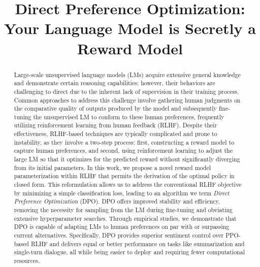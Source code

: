 \title{Direct Preference Optimization: Your Language Model is Secretly a Reward Model}

\begin{abstract}
Large-scale unsupervised language models (LMs) acquire extensive general knowledge and demonstrate certain reasoning capabilities; however, their behaviors are challenging to direct due to the inherent lack of supervision in their training process. Common approaches to address this challenge involve gathering human judgments on the comparative quality of outputs produced by the model and subsequently fine-tuning the unsupervised LM to conform to these human preferences, frequently utilizing reinforcement learning from human feedback (RLHF). Despite their effectiveness, RLHF-based techniques are typically complicated and prone to instability, as they involve a two-step process: first, constructing a reward model to capture human preferences, and second, using reinforcement learning to adjust the large LM so that it optimizes for the predicted reward without significantly diverging from its initial parameters. In this work, we propose a novel reward model parameterization within RLHF that permits the derivation of the optimal policy in closed form. This reformulation allows us to address the conventional RLHF objective by minimizing a simple classification loss, leading to an algorithm we term \textit{Direct Preference Optimization} (DPO). DPO offers improved stability and efficiency, removing the necessity for sampling from the LM during fine-tuning and obviating extensive hyperparameter searches. Through empirical studies, we demonstrate that DPO is capable of adapting LMs to human preferences on par with or surpassing current alternatives. Specifically, DPO provides superior sentiment control over PPO-based RLHF and delivers equal or better performance on tasks like summarization and single-turn dialogue, all while being easier to deploy and requiring fewer computational resources.
\end{abstract}

